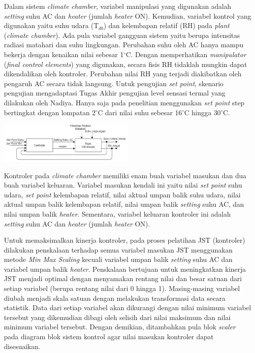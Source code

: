 \documentclass[a4paper,10pt]{article}
\makeatletter
\newenvironment{body}{\begin{multicols}{2}}{\end{multicols}}
\renewenvironment{figure}
{\def\@captype{figure}%
	\captionsetup{labelsep=period,format=hang,font=footnotesize,justification=justified}
}
{}
\makeatother
\begin{document}
\begin{body}
		Dalam sistem \textit{climate chamber}, variabel manipulasi yang digunakan adalah \textit{setting} suhu AC dan \textit{heater} (jumlah \textit{heater} ON). Kemudian, variabel kontrol yang digunakan yaitu suhu udara (T$_{db}$) dan kelembapan relatif (RH) pada \textit{plant} (\textit{climate chamber}). Ada pula variabel gangguan sistem yaitu berupa intensitas radiasi matahari dan suhu lingkungan. Perubahan suhu oleh AC hanya mampu bekerja dengan kenaikan nilai sebesar 1$^\circ$C. Dengan memperhatikan \textit{manipulator} (\textit{final control elements}) yang digunakan, secara fisis RH tidaklah mungkin dapat dikendalikan oleh kontroler. Perubahan nilai RH yang terjadi diakibatkan oleh pengaruh AC secara tidak langsung. Untuk pengujian \textit{set point}, skenario pengujian mengadaptasi Tugas Akhir pengujian level sensasi termal yang dilakukan oleh Nadiya\cite{skripsiMuna}. Hanya saja pada penelitian menggunakan \textit{set point} step bertingkat dengan lompatan 2$^{\circ}$C dari nilai suhu sebesar 16$^{\circ}$C hingga 30$^{\circ}$C.\\
		
		\begin{figure}
			\centering
			\includegraphics[width=0.5\textwidth]{figures/DiagramBlokFungsionalSistem}
			\caption{Diagram Blok Fungsional Sistem}
			\label{fig:5:DiagramBlokSistem}
		\end{figure}
		
		Kontroler pada \textit{climate chamber} memiliki enam buah variabel masukan dan dua buah variabel keluaran. Variabel masukan kendali ini yaitu nilai \textit{set point} suhu udara, \textit{set point} kelembapan relatif, nilai aktual umpan balik suhu udara, nilai aktual umpan balik kelembapan relatif, nilai umpan balik \textit{setting} suhu AC, dan nilai umpan balik \textit{heater}. Sementara, variabel keluaran kontroler ini adalah \textit{setting} suhu AC dan \textit{heater} (jumlah \textit{heater} ON).
		
		Untuk memaksimalkan kinerja kontroler, pada proses pelatihan JST (kontroler) dilakukan penskalaan terhadap semua variabel masukan JST menggunakan metode \textit{Min Max Scaling} kecuali variabel umpan balik \textit{setting} suhu AC dan variabel umpan balik \textit{heater}. Penskalaan bertujuan untuk meningkatkan kinerja JST menjadi optimal dengan menyamakan rentang nilai dan besar satuan dari setiap variabel (berupa rentang nilai dari 0 hingga 1). Masing-masing variabel diubah menjadi skala satuan dengan melakukan transformasi data secara statistik. Data dari setiap variabel akan dikurangi dengan nilai minimum variabel tersebut yang dikemudian dibagi oleh selisih dari nilai maksimum dan nilai minimum variabel tersebut. Dengan demikian, ditambahkan pula blok \textit{scaler} pada diagram blok sistem kontrol agar nilai masukan kontroler dapat disesuaikan.
		

\end{body}
\end{document}
